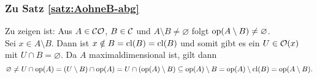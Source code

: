 %
            

\subsubsection{Zu Satz \ref{satz:AohneB-abg}}\label{anh:AohneB-abg}
    Zu zeigen ist: Aus $A \in \mathcal{CO}$, $B \in \mathcal{C}$ und $A \setminus B \neq \varnothing$ folgt $\text{op}(A \setminus B) \neq \varnothing$.\\
    Sei $x \in A \setminus B$. Dann ist $x \notin B = \text{cl}(B) = \text{cl}(B)$ und somit gibt es ein ${U \in \mathcal{O}(x)}$ mit ${U \cap B = \varnothing}$. Da $A$ maximaldimensional ist, gilt dann
    $$\varnothing \neq U \cap \text{op}(A) = (U \setminus B) \cap \text{op}(A) = U \cap (\text{op}(A) \setminus B) \subseteq \text{op}(A) \setminus B = \text{op}(A) \setminus \text{cl}(B) = \text{op}(A \setminus B).$$
    

